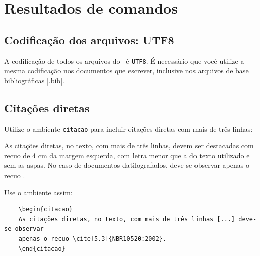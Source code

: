 


    \chapter{Resultados de comandos}\label{cap_exemplos}


    \section{Codificação dos arquivos: UTF8}

    A codificação de todos os arquivos do \abnTeX\ é \texttt{UTF8}. É necessário que
    você utilize a mesma codificação nos documentos que escrever, inclusive nos
    arquivos de base bibliográficas |.bib|.

    \section{Citações diretas}
    \label{sec-citacao}

    Utilize o ambiente \texttt{citacao} para incluir
    citações diretas com mais de três linhas:

    \begin{citacao}
    As citações diretas, no texto, com mais de três linhas, devem ser
    destacadas com recuo de 4 cm da margem esquerda, com letra menor que a do texto
    utilizado e sem as aspas. No caso de documentos datilografados, deve-se
    observar apenas o recuo \cite[5.3]{NBR10520:2002}.
    \end{citacao}

    Use o ambiente assim:

    \begin{verbatim}
    \begin{citacao}
    As citações diretas, no texto, com mais de três linhas [...] deve-se observar
    apenas o recuo \cite[5.3]{NBR10520:2002}.
    \end{citacao}
    \end{verbatim}


